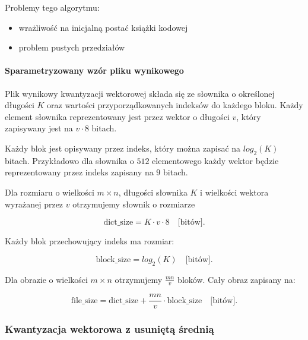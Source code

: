 \documentclass{article}
\begin{document}
Problemy tego algorytmu:

\begin{itemize}
	\item wrażliwość na inicjalną postać książki kodowej 
	\item problem pustych przedziałów 
\end{itemize}

\paragraph{Sparametryzowany wzór pliku wynikowego}
\label{sec:lgb_file_size}
Plik wynikowy kwantyzacji wektorowej składa się ze słownika o określonej długości $K$ oraz wartości przyporządkowanych indeksów do każdego bloku. Każdy element słownika reprezentowany jest przez wektor o długości $v$, który zapisywany jest na $v \cdot 8$ bitach.

Każdy blok jest opisywany przez indeks, który można zapisać na $log_2(K)$ bitach. Przykładowo dla słownika o $512$ elementowego każdy wektor będzie reprezentowany przez indeks zapisany na $9$ bitach.


Dla rozmiaru o wielkości $m \times n$, długości słownika $K$ i wielkości wektora wyrażanej przez $v$ otrzymujemy słownik o rozmiarze

\begin{equation}
	\textrm{dict\_size} = K \cdot v \cdot 8 \quad \textrm{[bitów]}.
	\label{eq:lgb_dict_size}
\end{equation}

Każdy blok przechowujący indeks ma rozmiar:

\begin{equation}
	\textrm{block\_size} = log_2(K)  \quad  \textrm{[bitów]}.
	\label{eq:lgb_indeks_size}
\end{equation}

Dla obrazie o wielkości $m \times n$ otrzymujemy $\frac{mn}{v}$ bloków. Cały obraz zapisany na: 

\begin{equation}
	\textrm{file\_size} = \textrm{dict\_size} + \frac{mn}{v} \cdot \textrm{block\_size}  \quad  \textrm{[bitów]}.
	\label{eq:lgb_image_size}
\end{equation}

\subsubsection{Kwantyzacja wektorowa z usuniętą średnią}
\end{document}
